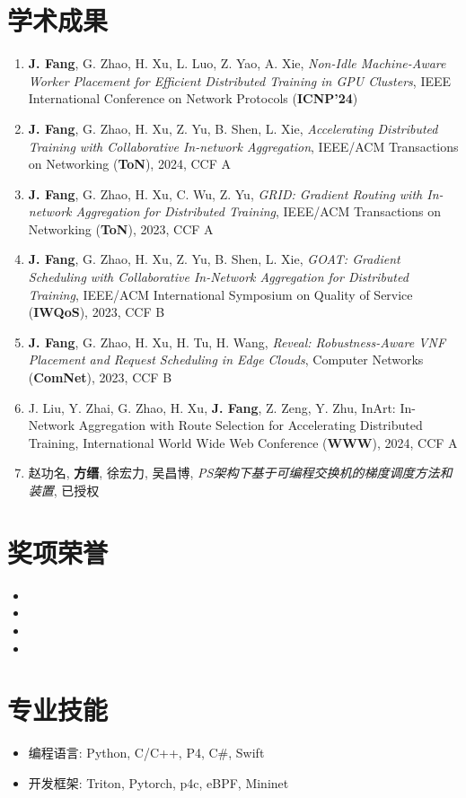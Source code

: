 \documentclass{resume}
\begin{document}
\section{学术成果}

\begin{enumerate}[parsep=0.5ex]
  \item \textbf{J. Fang}, G. Zhao, H. Xu, L. Luo, Z. Yao, A. Xie, \textit{Non-Idle Machine-Aware Worker Placement for Efficient Distributed Training in GPU Clusters}, IEEE International Conference on Network Protocols (\textbf{ICNP'24})
  \item \textbf{J. Fang}, G. Zhao, H. Xu, Z. Yu, B. Shen, L. Xie, \textit{Accelerating Distributed Training with Collaborative In-network Aggregation}, IEEE/ACM Transactions on Networking (\textbf{ToN}), 2024, CCF A
  \item \textbf{J. Fang}, G. Zhao, H. Xu, C. Wu, Z. Yu, \textit{GRID: Gradient Routing with In-network Aggregation for Distributed Training}, IEEE/ACM Transactions on Networking (\textbf{ToN}), 2023, CCF A
  \item \textbf{J. Fang}, G. Zhao, H. Xu, Z. Yu, B. Shen, L. Xie, \textit{GOAT: Gradient Scheduling with Collaborative In-Network Aggregation for Distributed Training}, IEEE/ACM International Symposium on Quality of Service (\textbf{IWQoS}), 2023, CCF B
  \item \textbf{J. Fang}, G. Zhao, H. Xu, H. Tu, H. Wang, \textit{Reveal: Robustness-Aware VNF Placement and Request Scheduling in Edge Clouds}, Computer Networks (\textbf{ComNet}), 2023, CCF B
  \item J. Liu, Y. Zhai, G. Zhao, H. Xu, \textbf{J. Fang}, Z. Zeng, Y. Zhu, InArt: In-Network Aggregation with Route Selection for Accelerating Distributed Training, International World Wide Web Conference (\textbf{WWW}), 2024, CCF A
  \item 赵功名, \textbf{方缙}, 徐宏力, 吴昌博, \textit{PS架构下基于可编程交换机的梯度调度方法和装置}, 已授权
\end{enumerate}

\section{奖项荣誉}

\begin{itemize}[parsep=0.5ex]
  \item {}
  \item {}
  \item {}
  \item {}
\end{itemize}

\section{专业技能}

\begin{itemize}[parsep=0.5ex]
  \item 编程语言: Python, C/C++, P4, C\#, Swift
  \item 开发框架: Triton, Pytorch, p4c, eBPF, Mininet
\end{itemize}
\end{document}
